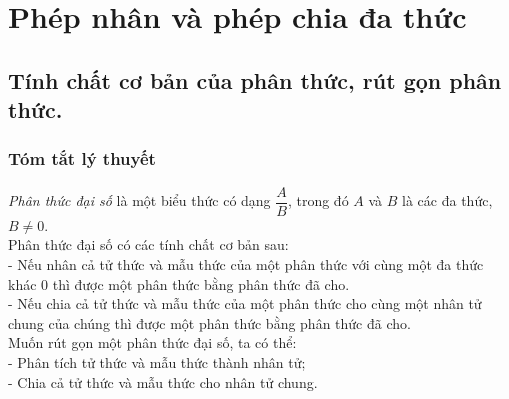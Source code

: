 \chapter{Phép nhân và phép chia đa thức}
\section{Tính chất cơ bản của phân thức, rút gọn phân thức.}
\subsection{Tóm tắt lý thuyết}
	\textit{Phân thức đại số} là một biểu thức có dạng $\dfrac{A}{B}$, trong đó $A$ và $B$ là các đa thức, $B \ne 0$.\\
	Phân thức đại số có các tính chất cơ bản sau:\\
	- Nếu nhân cả tử thức và mẫu thức của một phân thức với cùng một đa thức khác $0$ thì được một phân thức bằng phân thức đã cho.\\
	- Nếu chia cả tử thức và mẫu thức của một phân thức cho cùng một nhân tử chung của chúng thì được một phân thức bằng phân thức đã cho.\\
	Muốn rút gọn một phân thức đại số, ta có thể:\\
	- Phân tích tử thức và mẫu thức thành nhân tử;\\
	- Chia cả tử thức và mẫu thức cho nhân tử chung.
